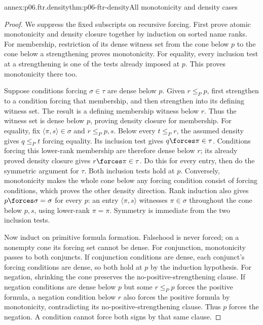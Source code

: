 \begin{annexitem}{annex:p06.ftr.density}{thm:p06-ftr-density}{All monotonicity and density cases}
\begin{proof}
We suppress the fixed subscripts on recursive forcing. First prove atomic
monotonicity and density closure together by induction on sorted name ranks.
For membership, restriction of its dense witness set from the cone below
\(p\) to the cone below a strengthening proves monotonicity.
For equality, every inclusion test at a strengthening is one of the
tests already imposed at \(p\). This proves monotonicity there too.

Suppose conditions forcing \(\sigma\in\tau\) are dense below \(p\).
Given \(r\leq_P p\), first strengthen to a condition forcing that
membership, and then strengthen into its defining witness set. The
result is a defining membership witness below \(r\). Thus the witness
set is dense below \(p\), proving density closure for membership.
For equality, fix \(\langle\pi,s\rangle\in\sigma\) and
\(r\leq_P p,s\). Below every \(t\leq_P r\), the assumed density gives
\(q\leq_P t\) forcing equality. Its inclusion test gives
\(q\forces\pi\in\tau\). Conditions forcing this lower-rank membership
are therefore dense below \(r\); its already proved density closure
gives \(r\forces\pi\in\tau\). Do this for every entry, then do the
symmetric argument for \(\tau\). Both inclusion tests hold at \(p\).
Conversely, monotonicity makes the whole cone below any forcing condition
consist of forcing conditions, which proves the other density direction.
Rank induction also gives \(p\forces\sigma=\sigma\) for every \(p\):
an entry \(\langle\pi,s\rangle\) witnesses \(\pi\in\sigma\) throughout
the cone below \(p,s\), using lower-rank \(\pi=\pi\).
Symmetry is immediate from the two inclusion tests.

Now induct on primitive formula formation. Falsehood is never forced;
on a nonempty cone its forcing set cannot be dense. For conjunction,
monotonicity passes to both conjuncts. If conjunction conditions are dense,
each conjunct's forcing conditions are dense, so both hold at \(p\) by
the induction hypothesis. For negation, shrinking the cone preserves the
no-positive-strengthening clause. If negation conditions are dense below
\(p\) but some \(r\leq_P p\) forces the positive formula, a negation
condition below \(r\) also forces the positive formula by monotonicity,
contradicting its no-positive-strengthening clause. Thus \(p\) forces
the negation. A condition cannot force both signs by that same clause.


\end{proof}
\end{annexitem}
